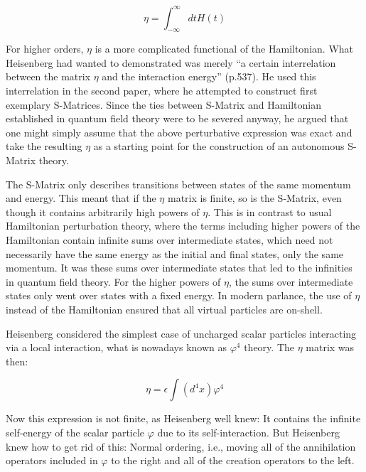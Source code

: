 \documentclass[12pt]{article}
\begin{document}
\begin{equation}
\eta = \int_{- \infty}^{\infty} dt H(t)
\end{equation}

For higher orders, $\eta$ is a more complicated functional of the Hamiltonian. What Heisenberg had wanted to demonstrated  was merely ``a certain interrelation between the matrix $\eta$ and the interaction energy'' (p.537). He used this interrelation in the second paper, where he attempted to construct first exemplary S-Matrices. Since the ties between S-Matrix and Hamiltonian established in quantum field theory were to be severed anyway, he argued that one might simply assume that the above perturbative expression was exact and take the resulting $\eta$ as a starting point for the construction of an autonomous S-Matrix theory.

The S-Matrix only describes transitions between states of the same momentum and energy. This meant that if the $\eta$ matrix is finite, so is the S-Matrix, even though it contains arbitrarily high powers of $\eta$. This is in contrast to usual Hamiltonian perturbation theory, where the terms including higher powers of the Hamiltonian contain infinite sums over intermediate states, which need not necessarily have the same energy as the initial and final states, only the same momentum. It was these sums over intermediate states that led to the infinities in quantum field theory. For the higher powers of $\eta$, the sums over intermediate states only went over states with a fixed energy. In modern parlance, the use of $\eta$ instead of the Hamiltonian ensured that all virtual particles are on-shell.

Heisenberg considered the simplest case of uncharged scalar particles interacting via a local interaction, what is nowadays known as $\varphi^4$ theory. The $\eta$ matrix was then:

\begin{equation}
\eta = \epsilon \int (d^4x) \varphi^4
\end{equation}

Now this expression is not finite, as Heisenberg well knew: It contains the infinite self-energy of the scalar particle $\varphi$ due to its self-interaction. But Heisenberg knew how to get rid of this: Normal ordering, i.e., moving all of the annihilation operators included in $\varphi$ to the right and all of the creation operators to the left. 
\end{document}
